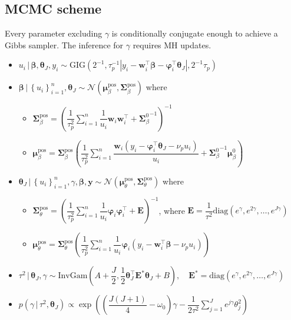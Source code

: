 \documentclass[12pt]{article}
\newcommand{\bs}{\boldsymbol}
\begin{document}
\subsection{MCMC scheme}
Every parameter excluding $\gamma$ is conditionally conjugate enough to achieve a Gibbs sampler. The inference for $\gamma$ requires MH updates.
\begin{itemize}
  \item $u_{i}\,|\, \bs{\beta}, \bs{\theta}_{J}, y_{i} \sim \mathrm{GIG}\left(2^{-1}, \tau_{p}^{-1}\left|y_{i}-\bs{w}_{i}^{\top}\bs{\beta}-\bs{\varphi}_{i}^{\top}\bs{\theta}_{J}\right|, 2^{-1}\tau_{p}\right)$
  \item $\bs{\beta}\,|\, \left\{u_{i}\right\}_{i=1}^{n}, \bs{\theta}_{J} \sim \mathcal{N}\left(\bs{\mu}_{\beta}^{\text{pos}}, \bs{\Sigma}_{\beta}^{\text{pos}}\right)$ where
  \begin{itemize}
    \item $\bs{\Sigma}_{\beta}^{\text{pos}} = \left(\dfrac{1}{\tau_{p}^{2}}\displaystyle \sum_{i=1}^{n}\dfrac{1}{u_{i}}\bs{w}_{i}\bs{w}_{i}^{\top} + {\bs{\Sigma}_{\beta}^{0}}^{-1} \right)^{-1}$
    \item $\bs{\mu}_{\beta}^{\text{pos}} = \bs{\Sigma}_{\beta}^{\text{pos}}\left(\dfrac{1}{\tau_{p}^{2}}\displaystyle \sum_{i=1}^{n}\dfrac{\bs{w}_{i}\left(y_{i}-\bs{\varphi}_{i}^{\top}\bs{\theta}_{J}-\nu_{p}u_{i}\right)}{u_{i}}+{\bs{\Sigma}_{\beta}^{0}}^{-1}\bs{\mu}_{\beta}^{0} \right) $
  \end{itemize}
  \item $\bs{\theta}_{J}\,|\,\left\{u_{i}\right\}_{i=1}^{n}, \gamma, \bs{\beta}, \mathbf{y} \sim \mathcal{N}\left(\bs{\mu}_{\theta}^{\text{pos}}, \bs{\Sigma}_{\theta}^{\text{pos}}\right)$ where
  \begin{itemize}
    \item $\bs{\Sigma}_{\theta}^{\text{pos}} = \left(\dfrac{1}{\tau_{p}^{2}}\displaystyle \sum_{i=1}^{n}\dfrac{1}{u_{i}}\bs{\varphi}_{i}\bs{\varphi}_{i}^{\top} + \bs{E}\right)^{-1}$, where $\bs{E}=\dfrac{1}{\tau^{2}}\mathrm{diag}\left(e^{\gamma}, e^{2\gamma}, \ldots , e^{J\gamma}\right)$
    \item $\bs{\mu}_{\theta}^{\text{pos}}= \bs{\Sigma}_{\theta}^{\text{pos}}\left(\dfrac{1}{\tau_{p}^{2}}\displaystyle \sum_{i=1}^{n}\dfrac{1}{u_{i}}\bs{\varphi}_{i}\left(y_{i}-\bs{w}_{i}^{\top}\bs{\beta}-\nu_{p}u_{i}\right)\right)$
  \end{itemize}
  \item $\tau^{2}\,|\,\bs{\theta}_{J}, \gamma \sim \mathrm{InvGam}\left(A+ \dfrac{J}{2}, \dfrac{1}{2}\bs{\theta}_{J}^{\top}\bs{E}^{*}\bs{\theta}_{J} + B\right), \quad \bs{E}^{*}=\mathrm{diag}\left(e^{\gamma}, e^{2\gamma}, \ldots , e^{J\gamma}\right)$
  \item $p\left(\gamma\,|\,\tau^{2},\bs{\theta}_{J}\right) \propto \exp\left(\left(\dfrac{J\left(J+1\right)}{4}-\omega_{0}\right)\gamma -\dfrac{1}{2\tau^{2}}\displaystyle \sum_{j=1}^{J}e^{j\gamma}\theta_{j}^{2} \right)$
\end{itemize}
\end{document}
